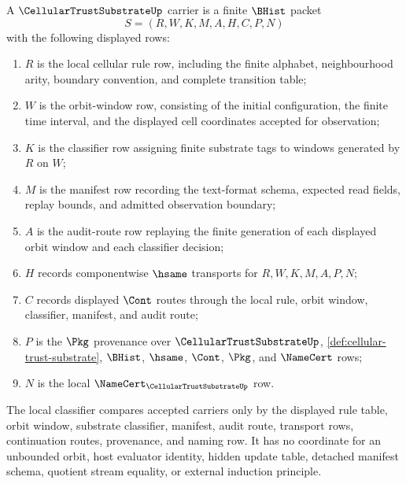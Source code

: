 \begin{definition}
\label{def:cellular-trust-substrate-carrier}
A $\CellularTrustSubstrateUp$ carrier is a finite $\BHist$ packet
$$
S=(R,W,K,M,A,H,C,P,N)
$$
with the following displayed rows:
\begin{enumerate}
\item $R$ is the local cellular rule row, including the finite alphabet, neighbourhood arity, boundary convention, and complete transition table;
\item $W$ is the orbit-window row, consisting of the initial configuration, the finite time interval, and the displayed cell coordinates accepted for observation;
\item $K$ is the classifier row assigning finite substrate tags to windows generated by $R$ on $W$;
\item $M$ is the manifest row recording the text-format schema, expected read fields, replay bounds, and admitted observation boundary;
\item $A$ is the audit-route row replaying the finite generation of each displayed orbit window and each classifier decision;
\item $H$ records componentwise $\hsame$ transports for $R,W,K,M,A,P,N$;
\item $C$ records displayed $\Cont$ routes through the local rule, orbit window, classifier, manifest, and audit route;
\item $P$ is the $\Pkg$ provenance over $\CellularTrustSubstrateUp$, \autoref{def:cellular-trust-substrate}, $\BHist$, $\hsame$, $\Cont$, $\Pkg$, and $\NameCert$ rows;
\item $N$ is the local $\NameCert_{\CellularTrustSubstrateUp}$ row.
\end{enumerate}
The local classifier compares accepted carriers only by the displayed rule table, orbit window, substrate classifier, manifest, audit route, transport rows, continuation routes, provenance, and naming row. It has no coordinate for an unbounded orbit, host evaluator identity, hidden update table, detached manifest schema, quotient stream equality, or external induction principle.
\end{definition}

